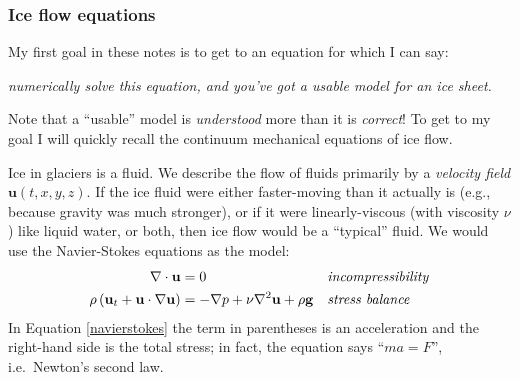 \documentclass[titlepage,letterpaper,final,12pt]{scrartcl}
\begin{document}
\subsubsection*{Ice flow equations}  My first goal in these notes is to get to an equation for which I can say:
\begin{center}
\emph{numerically solve this equation, and you've got a usable model for an ice sheet.}
\end{center}
Note that a ``usable'' model is \emph{understood} more than it is \emph{correct}!  To get to my goal I will quickly recall the continuum mechanical equations of ice flow.  

Ice in glaciers is a fluid.  We describe the flow of fluids primarily by a \emph{velocity field} $\mathbf{u}(t,x,y,z)$.  If the ice fluid were either faster-moving than it actually is (e.g., because gravity was much stronger), or if it were linearly-viscous (with viscosity $\nu$) like liquid water, or both, then ice flow would be a ``typical'' fluid.  We would use the Navier-Stokes equations as the model:
\begin{align}
\nabla \cdot \mathbf{u} &= 0 &&\text{\emph{incompressibility}} \label{incompressible} \\
\rho \left(\mathbf{u}_t + \mathbf{u}\cdot\nabla \mathbf{u}\right) &= -\nabla p + \nu \nabla^2 \mathbf{u} + \rho \mathbf{g} &&\text{\emph{stress balance}} \label{navierstokes}
\end{align}
In Equation \eqref{navierstokes} the term in parentheses is an acceleration and the right-hand side is the total stress; in fact, the equation says ``$ma=F$'', i.e.~Newton's second law.
\end{document}
